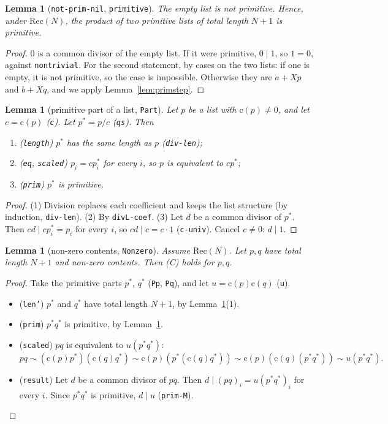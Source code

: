\documentclass[11pt]{amsart}
\newtheorem{lemma}[theorem]{Lemma}
\theoremstyle{definition}
\theoremstyle{remark}
\newcommand{\nm}[1]{\textup{\texttt{#1}}}
\newcommand{\cont}{\mathrm{c}}
\begin{document}
\begin{lemma}[\nm{not-prim-nil}, \nm{primitive}]\label{lem:primitive}
The empty list is not primitive. Hence, under $\mathrm{Rec}(N)$, the
product of two primitive lists of total length $N+1$ is primitive.
\end{lemma}
\begin{proof}
$0$ is a common divisor of the empty list. If it were primitive, $0\mid1$,
so $1=0$, against \nm{nontrivial}. For the second statement, by cases on
the two lists: if one is empty, it is not primitive, so the case is
impossible. Otherwise they are $a+Xp$ and $b+Xq$, and we apply
Lemma~\ref{lem:primstep}.
\end{proof}

\begin{lemma}[primitive part of a list, \nm{Part}]\label{lem:part}
Let $p$ be a list with $\cont(p)\neq0$, and let $c = \cont(p)$ (\nm{c}).
Let $p^* = p/c$ (\nm{qs}). Then
\begin{enumerate}
\item (\nm{length}) $p^*$ has the same length as $p$ (\nm{div-len});
\item (\nm{eq}, \nm{scaled}) $p_i = cp^*_i$ for every $i$, so $p$ is
  equivalent to $cp^*$;
\item (\nm{prim}) $p^*$ is primitive.
\end{enumerate}
\end{lemma}
\begin{proof}
(1) Division replaces each coefficient and keeps the list structure (by
induction, \nm{div-len}). (2) By \nm{divL-coef}.
(3) Let $d$ be a common divisor of $p^*$. Then $cd\mid cp^*_i = p_i$ for
every $i$, so $cd\mid c = c\cdot1$ (\nm{c-univ}). Cancel $c\neq0$:
$d\mid1$.
\end{proof}

\begin{lemma}[non-zero contents, \nm{Nonzero}]\label{lem:nonzero}
Assume $\mathrm{Rec}(N)$. Let $p,q$ have total length $N+1$ and non-zero
contents. Then (C) holds for $p,q$.
\end{lemma}
\begin{proof}
Take the primitive parts $p^*$, $q^*$ (\nm{Pp}, \nm{Pq}), and let
$u = \cont(p)\cont(q)$ (\nm{u}).
\begin{itemize}
\item (\nm{len'}) $p^*$ and $q^*$ have total length $N+1$, by
  Lemma~\ref{lem:part}(1).
\item (\nm{prim}) $p^*q^*$ is primitive, by Lemma~\ref{lem:primitive}.
\item (\nm{scaled}) $pq$ is equivalent to $u(p^*q^*)$:
  \[pq \sim (\cont(p)p^*)(\cont(q)q^*) \sim \cont(p)(p^*(\cont(q)q^*))
  \sim \cont(p)(\cont(q)(p^*q^*)) \sim u(p^*q^*).\]
\item (\nm{result}) Let $d$ be a common divisor of $pq$. Then
  $d\mid (pq)_i = u(p^*q^*)_i$ for every $i$. Since $p^*q^*$ is primitive,
  $d\mid u$ (\nm{prim-M}).\qedhere
\end{itemize}
\end{proof}
\end{document}
